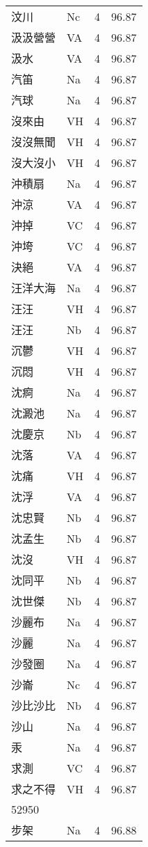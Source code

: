 \documentclass[twocolumn]{book}
\begin{document}
\begin{supertabular}{llrr}
汶川 & Nc & 4 &  96.87\\
汲汲營營 & VA & 4 &  96.87\\
汲水 & VA & 4 &  96.87\\
汽笛 & Na & 4 &  96.87\\
汽球 & Na & 4 &  96.87\\
沒來由 & VH & 4 &  96.87\\
沒沒無聞 & VH & 4 &  96.87\\
沒大沒小 & VH & 4 &  96.87\\
沖積扇 & Na & 4 &  96.87\\
沖涼 & VA & 4 &  96.87\\
沖掉 & VC & 4 &  96.87\\
沖垮 & VC & 4 &  96.87\\
決絕 & VA & 4 &  96.87\\
汪洋大海 & Na & 4 &  96.87\\
汪汪 & VH & 4 &  96.87\\
汪汪 & Nb & 4 &  96.87\\
沉鬱 & VH & 4 &  96.87\\
沉悶 & VH & 4 &  96.87\\
沈痾 & Na & 4 &  96.87\\
沈澱池 & Na & 4 &  96.87\\
沈慶京 & Nb & 4 &  96.87\\
沈落 & VA & 4 &  96.87\\
沈痛 & VH & 4 &  96.87\\
沈浮 & VA & 4 &  96.87\\
沈忠賢 & Nb & 4 &  96.87\\
沈孟生 & Nb & 4 &  96.87\\
沈沒 & VH & 4 &  96.87\\
沈同平 & Nb & 4 &  96.87\\
沈世傑 & Nb & 4 &  96.87\\
沙麗布 & Na & 4 &  96.87\\
沙麗 & Na & 4 &  96.87\\
沙發圈 & Na & 4 &  96.87\\
沙崙 & Nc & 4 &  96.87\\
沙比沙比 & Nb & 4 &  96.87\\
沙山 & Na & 4 &  96.87\\
汞 & Na & 4 &  96.87\\
求測 & VC & 4 &  96.87\\
求之不得 & VH & 4 &  96.87\\
52950\\
步架 & Na & 4 &  96.88\\

\end{supertabular}
\end{document}
